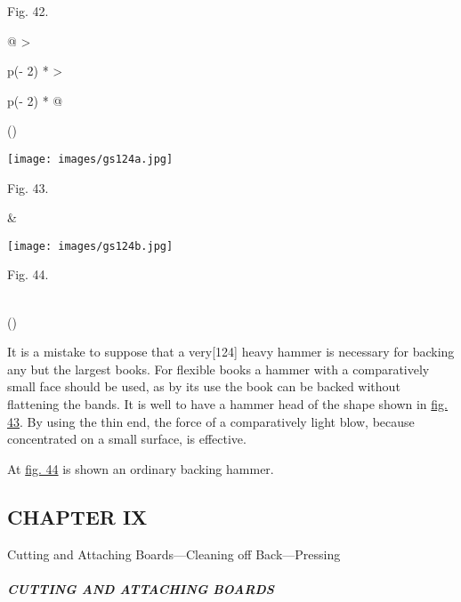 \documentclass[
]{article}
\begin{document}
Fig. 42.

\begin{longtable}[]{@{}
  >{\raggedright\arraybackslash}p{(\columnwidth - 2\tabcolsep) * }
  >{\raggedright\arraybackslash}p{(\columnwidth - 2\tabcolsep) * }@{}}
\toprule()
\endhead
\begin{minipage}[t]{\linewidth}\raggedright
\texttt{[image: images/gs124a.jpg]}

Fig. 43.
\end{minipage} & \begin{minipage}[t]{\linewidth}\raggedright
\protect\hypertarget{Fig_44}{}{}
\texttt{[image: images/gs124b.jpg]}

Fig. 44.
\end{minipage} \\
\bottomrule()
\end{longtable}

It is a mistake to suppose that a
very{\protect\hypertarget{Page_124}{}{{[}124{]}}} heavy hammer is
necessary for backing any but the largest books. For flexible books a
hammer with a comparatively small face should be used, as by its use the
book can be backed without flattening the bands. It is well to have a
hammer head of the shape shown in \protect\hyperlink{Fig_43}{fig. 43}.
By using the thin end, the force of a comparatively light blow, because
concentrated on a small surface, is effective.

At \protect\hyperlink{Fig_44}{fig. 44} is shown an ordinary backing
hammer.

\hypertarget{chapter-ix}{%
\subsection[CHAPTER
IX]{\texorpdfstring{\protect\hypertarget{CHAPTER_IX}{}{}CHAPTER
IX}{CHAPTER IX}}\label{chapter-ix}}

Cutting and Attaching Boards---Cleaning off Back---Pressing

\hypertarget{cutting-and-attaching-boards}{%
\subparagraph{CUTTING AND ATTACHING
BOARDS}\label{cutting-and-attaching-boards}}
\end{document}
